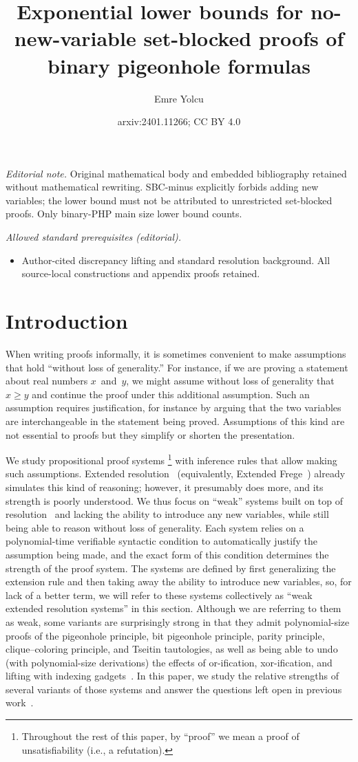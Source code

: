\documentclass[10pt,a4paper]{article}
\title{Exponential lower bounds for no-new-variable set-blocked proofs of binary pigeonhole formulas}
\author{Emre Yolcu}
\date{arxiv:2401.11266; CC BY 4.0}
\begin{document}
\maketitle
\noindent\textit{Editorial note.} Original mathematical body and embedded bibliography retained without mathematical rewriting. SBC-minus explicitly forbids adding new variables; the lower bound must not be attributed to unrestricted set-blocked proofs. Only binary-PHP main size lower bound counts.\par\medskip
\noindent\textit{Allowed standard prerequisites (editorial).}\begin{itemize}
\item Author-cited discrepancy lifting and standard resolution background. All source-local constructions and appendix proofs retained.
\end{itemize}\medskip
\section{Introduction}
\label{sec:introduction}

When writing proofs informally, it is sometimes convenient
to make assumptions that hold ``without loss of generality.''
For instance, if we are proving a statement about real numbers $x$~and~$y$,
we might assume without loss of generality that $x \geq y$
and continue the proof under this additional assumption.
Such an assumption requires justification,
for instance by arguing that the two variables are
interchangeable in the statement being proved.
Assumptions of this kind are not essential to proofs
but they simplify or shorten the presentation.

We study propositional proof systems%
\footnote{Throughout the rest of this paper, by ``proof''
  we mean a proof of unsatisfiability (i.e., a refutation).}
with inference rules that allow making such assumptions.
Extended resolution~\cite{Tse68}
(equivalently, Extended Frege~\cite{CR79})
already simulates this kind of reasoning;
however, it presumably does more,
and its strength is poorly understood.
We thus focus on ``weak'' systems
built on top of resolution~\cite{Bla37,Rob65}
and lacking the ability to introduce any new variables,
while still being able to reason without loss of generality.
Each system relies on a polynomial-time verifiable syntactic condition
to automatically justify the assumption being made,
and the exact form of this condition
determines the strength of the proof system.
The systems are defined by first generalizing the extension rule
and then taking away the ability to introduce new variables,
so, for lack of a better term, we will refer to these systems
collectively as ``weak extended resolution systems'' in this section.
Although we are referring to them as weak,
some variants are surprisingly strong in that they admit
polynomial-size proofs of the pigeonhole principle,
bit pigeonhole principle, parity principle,
clique--coloring principle, and Tseitin tautologies,
as well as being able to undo (with polynomial-size derivations)
the effects of or-ification, xor-ification,
and lifting with indexing gadgets~\cite{BT21}.
In this paper, we study the relative strengths
of several variants of those systems
and answer the questions left open in previous work~\cite[Section~1.4]{YH23}.
\end{document}

